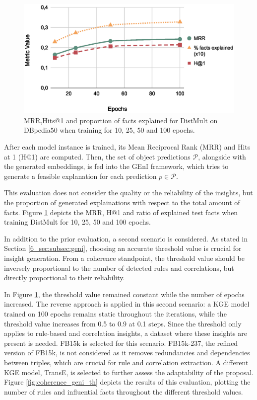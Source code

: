 \begin{figure}[t]
    \centering
    \includegraphics[width=.9\linewidth]{6_kbsextractiondl/figures/coherence_geni_epochs.eps}
    \caption{MRR,Hits@1 and proportion of facts explained for DistMult on DBpedia50 when training for 10, 25, 50 and 100 epochs.}
    \label{fig:coherence_geni_epochs}
\end{figure}

After each model instance is trained, its Mean Reciprocal Rank (MRR) and Hits at 1 (H@1) are computed. Then, the set of object predictions $\mathcal{P}$, alongside with the generated embeddings, is fed into the GEnI framework, which tries to generate a feasible explanation for each prediction $p \in \mathcal{P}$.

This evaluation does not consider the quality or the reliability of the insights, but the proportion of generated explainations with respect to the total amount of facts. Figure \ref{fig:coherence_geni_epochs} depicts the MRR, H@1 and ratio of explained test facts when training DistMult for 10, 25, 50 and 100 epochs.

In addition to the prior evaluation, a second scenario is considered. As stated in Section \ref{6_sec:subsec:geni}, choosing an accurate threshold value is crucial for insight generation. From a coherence standpoint, the threshold value should be inversely proportional to the number of detected rules and correlations, but directly proportional to their reliability. 

In Figure \ref{fig:coherence_geni_epochs}, the threshold value remained constant while the number of epochs increased. The reverse approach is applied in this second scenario: a KGE model trained on 100 epochs remains static throughout the iterations, while the threshold value increases from 0.5 to 0.9 at 0.1 steps. Since the threshold only applies to rule-based and correlation insights, a dataset where these insights are present is needed. FB15k is selected for this scenario. FB15k-237, the refined version of FB15k, is not considered as it removes redundancies and dependencies between triples, which are crucial for rule and correlation extraction. A different KGE model, TransE, is selected to further assess the adaptability of the proposal. Figure \ref{fig:coherence_geni_th} depicts the results of this evaluation, plotting the number of rules and influential facts throughout the different threshold values.

